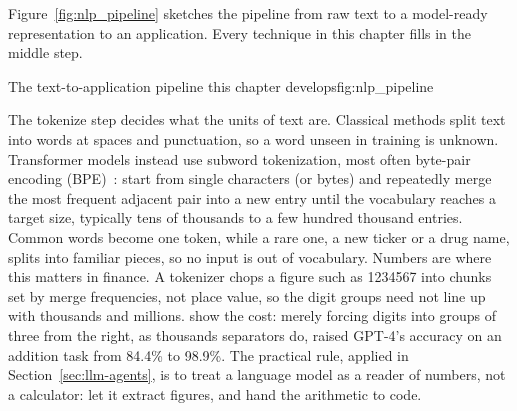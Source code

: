 \documentclass[../ai_in_finance]{subfiles}
\begin{document}
Figure~\ref{fig:nlp_pipeline} sketches the pipeline from raw text to a model-ready representation to an application. Every technique in this chapter fills in the middle step.

\begin{bookfigure}[htbp]{The text-to-application pipeline this chapter develops}{fig:nlp_pipeline}
\end{bookfigure}

The tokenize step decides what the units of text are. Classical methods split text into words at spaces and punctuation, so a word unseen in training is unknown. Transformer models instead use subword tokenization, most often byte-pair encoding (BPE)~\parencite{sennrich2016neural}: start from single characters (or bytes) and repeatedly merge the most frequent adjacent pair into a new entry until the vocabulary reaches a target size, typically tens of thousands to a few hundred thousand entries. Common words become one token, while a rare one, a new ticker or a drug name, splits into familiar pieces, so no input is out of vocabulary. Numbers are where this matters in finance. A tokenizer chops a figure such as 1234567 into chunks set by merge frequencies, not place value, so the digit groups need not line up with thousands and millions. \textcite{singh2024tokenization} show the cost: merely forcing digits into groups of three from the right, as thousands separators do, raised GPT-4's accuracy on an addition task from 84.4\% to 98.9\%. The practical rule, applied in Section~\ref{sec:llm-agents}, is to treat a language model as a reader of numbers, not a calculator: let it extract figures, and hand the arithmetic to code.
\end{document}
